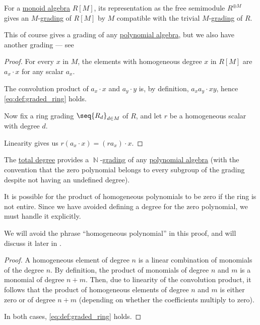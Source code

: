 \begin{proposition}\label{thm:semigroup_algebra_grading}
  For a \hyperref[def:semigroup_algebra]{monoid algebra} \( R[M] \), its representation as the free semimodule \( R^{\oplus M} \) gives an \( M \)-\hyperref[def:graded_algebra]{grading} of \( R[M] \) by \( M \) compatible with the trivial \( M \)-\hyperref[def:ring_grading]{grading} of \( R \).
\end{proposition}
\begin{comments}
  \item This of course gives a grading of any \hyperref[def:polynomial_algebra]{polynomial algebra}, but we also have another grading --- see 
\end{comments}
\begin{proof}
  For every \( x \) in \( M \), the elements with homogeneous degree \( x \) in \( R[M] \) are \( a_x \cdot x \) for any scalar \( a_x \).

  The convolution product of \( a_x \cdot x \) and \( a_y \cdot y \) is, by definition, \( a_x a_y \cdot xy \), hence \eqref{eq:def:graded_ring} holds.

  Now fix a ring grading \( \seq{ R_d }_{d \in M} \) of \( R \), and let \( r \) be a homogeneous scalar with degree \( d \).

  Linearity gives us \( r (a_x \cdot x) = (r a_x) \cdot x \).
\end{proof}

\begin{proposition}\label{thm:polynomial_algebra_grading}
  The \hyperref[def:polynomial_degree]{total degree} provides a \( \BbbN \)-\hyperref[def:algebra_grading]{grading} of any \hyperref[def:polynomial_algebra]{polynomial algebra} (with the convention that the zero polynomial belongs to every subgroup of the grading despite not having an undefined degree).
\end{proposition}
\begin{comments}
  \item It is possible for the product of homogeneous polynomials to be zero if the ring is not entire. Since we have avoided defining a degree for the zero polynomial, we must handle it explicitly.

  \item We will avoid the phrase \enquote{homogeneous polynomial} in this proof, and will discuss it later in .
\end{comments}
\begin{proof}
  A homogeneous element of degree \( n \) is a linear combination of monomials of the degree \( n \). By definition, the product of monomials of degree \( n \) and \( m \) is a monomial of degree \( n + m \). Then, due to linearity of the convolution product, it follows that the product of homogeneous elements of degree \( n \) and \( m \) is either zero or of degree \( n + m \) (depending on whether the coefficients multiply to zero).

  In both cases, \eqref{eq:def:graded_ring} holds.
\end{proof}

